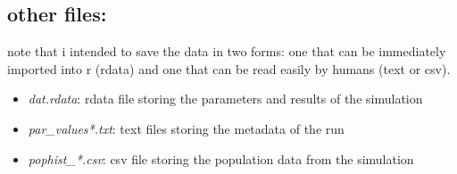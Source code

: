 \documentclass[11pt,a4paper]{article}
\begin{document}
\subsection{other files:}
note that i intended to save the data in two forms: one that can be immediately imported into r (rdata) and one that can be read easily by humans (text or csv).
\begin{itemize}
  \item \textit{dat.rdata}: rdata file storing the parameters and results of the simulation
  \item \textit{par\_values*.txt}: text files storing the metadata of the run
  \item \textit{pophist\_*.csv}: csv file storing the population data from the simulation
\end{itemize}
\end{document}
